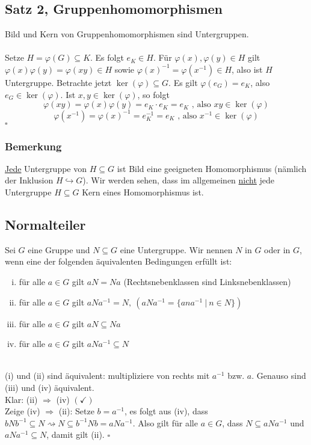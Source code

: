 \subsection{Satz 2, Gruppenhomomorphismen}
\label{sub:satz_ghm}
Bild und Kern von Gruppenhomomorphismen sind Untergruppen.\\

\\
Setze $H=\varphi(G)\subseteq K$. Es folgt $e_K \in H$. Für $\varphi(x),\varphi(y)\in H$ gilt $\varphi(x)\varphi(y)=\varphi(xy)\in H$ sowie $\varphi(x)^{-1}=\varphi(x^{-1}) \in H$, also ist $H$ Untergruppe. 
Betrachte jetzt $\ker(\varphi)\subseteq G$. 
Es gilt $\varphi(e_G)=e_K$, also $e_G \in \ker(\varphi)$. 
Ist $x,y \in \ker(\varphi)$, so folgt 
\[
\varphi(xy)=\varphi(x)\varphi(y)=e_K \cdot e_K=e_K \text{ , also } xy \in \ker(\varphi)
\]
\[
\varphi(x^{-1})=\varphi(x)^{-1}=e_K^{-1}=e_K \text{ , also } x^{-1} \in \ker(\varphi) 
\]
\hfill $\square$

\subsubsection*{Bemerkung}
\uline{Jede} Untergruppe von $H\subseteq G$ ist Bild eine geeigneten Homomorphismus (nämlich der Inklusion $H \hookrightarrow G$).
Wir werden sehen, dass im allgemeinen \uline{nicht} jede Untergruppe $H\subseteq G$ Kern eines Homomorphismus ist.

\subsection{Normalteiler}
\label{sub:normalteiler}
Sei $G$ eine Gruppe und $N\subseteq G$ eine Untergruppe. 
Wir nennen $N$  in $G$ oder  in $G$, wenn eine der folgenden äquivalenten Bedingungen erfüllt ist:
\begin{enumerate}[(i)]
	\item für alle $a\in G$ gilt $aN=Na$ (Rechtsnebenklassen sind Linksnebenklassen)
	\item für alle $a\in G$ gilt $aNa^{-1}=N,~ (aNa^{-1}=\{ana^{-1}~|~n\in N \})$
	\item für alle $a\in G$ gilt $aN\subseteq Na$
	\item für alle $a\in G$ gilt $aNa^{-1}\subseteq N$
\end{enumerate}

\\
(i) und (ii) sind äquivalent: multipliziere von rechts mit $a^{-1}$ bzw. $a$. Genauso sind (iii) und (iv) äquivalent.\\
Klar: (ii) $\Rightarrow$ (iv) $(\checkmark)$\\
Zeige (iv) $\Rightarrow$ (ii): Setze $b=a^{-1}$, es folgt aus (iv), dass $bNb^{-1}\subseteq N \rightsquigarrow N\subseteq b^{-1}Nb=aNa^{-1}$. 
Also gilt für alle $a\in G$, dass $N\subseteq aNa^{-1}$ und $aNa^{-1}\subseteq N$, damit gilt (ii).
\hfill $\square$


